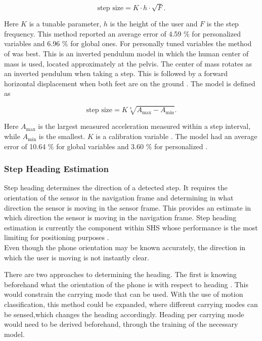 \begin{equation}
	\label{eq:Tian2016_sle}
	\text{step size} = K \cdot h \cdot \sqrt{F}.
\end{equation}

Here $K$ is a tunable parameter, $h$ is the height of the user and $F$ is the step frequency. This method reported an average error of  4.59 \% for personalized variables and 6.96 \% for global ones. For personally tuned variables the method of \cite{Weinberg2002} was best. This is an inverted pendulum model in which the human center of mass is used, located approximately at the pelvis. The center of mass rotates as an inverted pendulum when taking a step. This is followed by a forward horizontal displacement when both feet are on the ground \cite{Diez2018}. The model is defined as 

\begin{equation}
\text{step size} =K \sqrt[4]{A_{\max }-A_{\min }}.
\label{eq:weinberg_stepsize}
\end{equation}

Here $A_{\max}$ is the largest measured acceleration measured within a step interval, while $A_{\min}$ is the smallest. $K$ is a calibration variable  \cite{Weinberg2002,Diez2018}. The model had an average error of  10.64 \% for global variables and  3.60 \% for personalized \cite{Vezocnik2019}.



\subsubsection{Step Heading Estimation}
Step heading determines the direction of a detected step. It requires the orientation of the sensor in the navigation frame and determining in what direction the sensor is moving in the sensor frame. This provides an estimate in which direction the sensor is moving in the navigation frame.  Step heading estimation is currently the component within SHS whose performance is the most limiting for positioning purposes \cite{Diez2018b, Qian2013,Combettes2017}.\\
Even though the phone orientation may be known accurately, the direction in which the user is moving is not instantly clear. \par
There are two approaches to determining the heading. The first is knowing beforehand what the orientation of the phone is with respect to heading \cite{Tian2016}.  This would constrain the carrying mode that can be used.  With the use of motion classification, this method could be expanded, where different carrying modes can be sensed,which changes the heading accordingly. Heading per carrying mode would need to be derived beforehand, through the training of the necessary model. 

